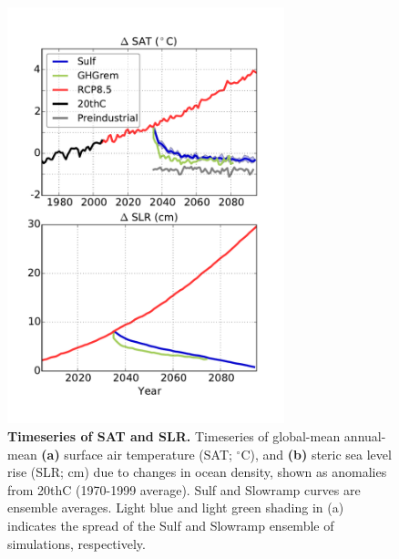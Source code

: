 \documentclass[draft,grl]{AGUTeX}  %
\begin{document}
\begin{article}
\begin{figure}[htbp] %
\centering
 \noindent\includegraphics[width=19pc]{figures/SAT_SLR_timeseries_geotimescalesWAISpaper.pdf} %
\caption{\textbf{Timeseries of SAT and SLR.} Timeseries of global-mean annual-mean \textbf{(a)} surface air temperature (SAT; $^\circ$C), and \textbf{(b)} steric sea level rise (SLR; cm) due to changes in ocean density, shown as anomalies from 20thC (1970-1999 average). Sulf and Slowramp curves are ensemble averages. Light blue and light green shading in (a) indicates the spread of the Sulf and Slowramp ensemble of simulations, respectively.}
\label{fig:gmts} %
\end{figure}



\end{article}
\end{document}
